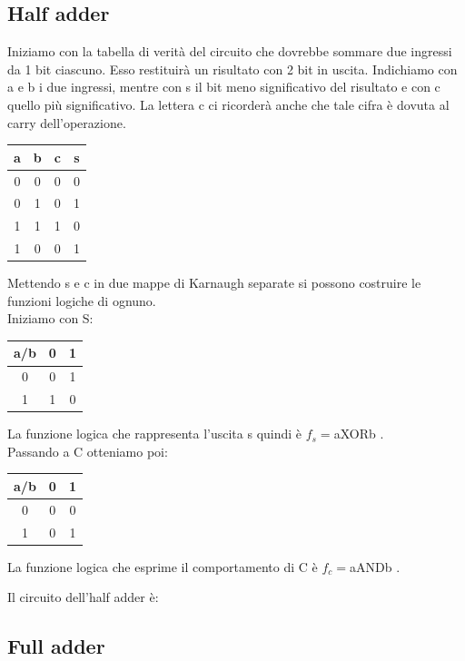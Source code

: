 \documentclass[a4paper]{book}
\begin{document}
\subsection{Half adder}
Iniziamo con la tabella di verità del circuito che dovrebbe sommare due ingressi da 1 bit ciascuno.
Esso restituirà un risultato con 2 bit in uscita.
Indichiamo con a e b i due ingressi, mentre con s il bit meno significativo del risultato e con c quello più significativo.
La lettera c ci ricorderà anche che tale cifra è dovuta al carry dell'operazione.
\newline
\begin{tabular}{|c|c|c|c|}

\hline
a & b & c & s \\ \hline
0 & 0 & 0 & 0 \\ \hline
0 & 1 & 0 & 1 \\ \hline
1 & 1 & 1 & 0 \\ \hline
1 & 0 & 0 & 1 \\ 
\hline
\end{tabular}



Mettendo s e c in due mappe di Karnaugh separate si possono costruire le funzioni logiche di ognuno.\\
Iniziamo con S:

\begin{tabular}{|c|c|c|}
\hline
a/b & 0 & 1 \\ \hline
0   & 0 & \cellcolor{yellow}1 \\ \hline
1   & \cellcolor{yellow}1 & 0 \\ \hline
\end{tabular}

La funzione logica che rappresenta l'uscita s quindi è \(f_s=\)aXORb .\\
Passando a C otteniamo poi:

\begin{tabular}{|c|c|c|}
\hline
a/b & 0 & 1 \\ \hline
0   & 0 & 0 \\ \hline
1   & 0 & \cellcolor{yellow}1 \\ \hline
\end{tabular}

La funzione logica che esprime il comportamento di C è \(f_c=\)aANDb .

Il circuito dell'half adder è:


\subsection{Full adder}
\end{document}
